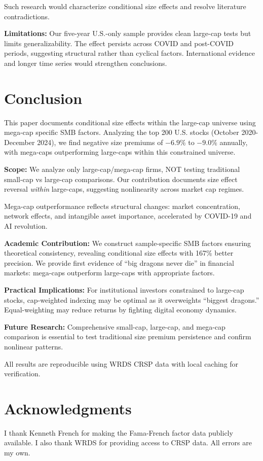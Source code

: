 \documentclass[10pt,letterpaper]{article}
\begin{document}
Such research would characterize conditional size effects and resolve literature contradictions.

\textbf{Limitations:} Our five-year U.S.-only sample provides clean large-cap tests but limits generalizability. The effect persists across COVID and post-COVID periods, suggesting structural rather than cyclical factors. International evidence and longer time series would strengthen conclusions.

\section*{Conclusion}

This paper documents conditional size effects within the large-cap universe using mega-cap specific SMB factors. Analyzing the top 200 U.S. stocks (October 2020-December 2024), we find negative size premiums of $-6.9\%$ to $-9.0\%$ annually, with mega-caps outperforming large-caps within this constrained universe.

\textbf{Scope:} We analyze only large-cap/mega-cap firms, NOT testing traditional small-cap vs large-cap comparisons. Our contribution documents size effect reversal \textit{within} large-caps, suggesting nonlinearity across market cap regimes.

Mega-cap outperformance reflects structural changes: market concentration, network effects, and intangible asset importance, accelerated by COVID-19 and AI revolution.

\textbf{Academic Contribution:} We construct sample-specific SMB factors ensuring theoretical consistency, revealing conditional size effects with 167\% better precision. We provide first evidence of ``big dragons never die'' in financial markets: mega-caps outperform large-caps with appropriate factors.

\pagebreak[2]
\textbf{Practical Implications:} For institutional investors constrained to large-cap stocks, cap-weighted indexing may be optimal as it overweights ``biggest dragons.'' Equal-weighting may reduce returns by fighting digital economy dynamics.

\textbf{Future Research:} Comprehensive small-cap, large-cap, and mega-cap comparison is essential to test traditional size premium persistence and confirm nonlinear patterns.

All results are reproducible using WRDS CRSP data with local caching for verification.

\newpage
\section*{Acknowledgments}

I thank Kenneth French for making the Fama-French factor data publicly available. I also thank WRDS for providing access to CRSP data. All errors are my own.

\nolinenumbers


\end{document}
